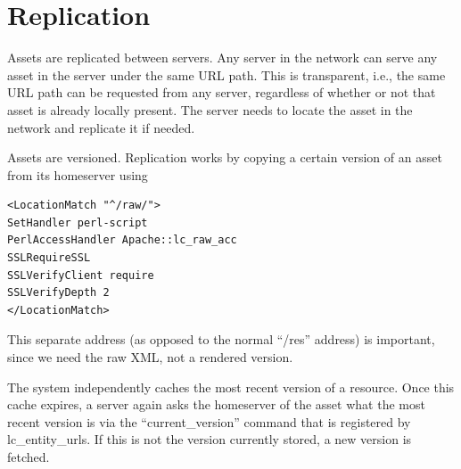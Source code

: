 \section{Replication}\label{replication}
Assets are replicated between servers. Any server in the network can serve any asset in the server under the same URL path. This is transparent, i.e., the same URL path can be requested from any server, regardless of whether or not that asset is already locally present. The server needs to locate the asset in the network and replicate it if needed.

Assets are versioned. Replication works by copying a certain version of an asset from its homeserver using
\begin{verbatim}
<LocationMatch "^/raw/">
SetHandler perl-script
PerlAccessHandler Apache::lc_raw_acc
SSLRequireSSL
SSLVerifyClient require
SSLVerifyDepth 2
</LocationMatch>
\end{verbatim}
This separate address (as opposed to the normal ``/res'' address) is important, since we need the raw XML, not a rendered version.

The system independently caches the most recent version of a resource. Once this cache expires, a server again asks the homeserver of the asset what the most recent version is via the ``current\_version'' command that is registered by lc\_entity\_urls. If this is not the version currently stored, a new version is fetched.
